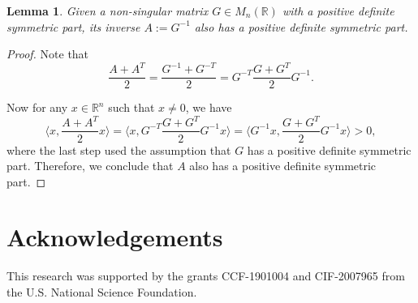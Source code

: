 \documentclass[a4paper, 11pt]{article}
\newtheorem{lem}[thm]{Lemma}
\begin{document}
\vspace{.3em} \begin{lem}
\label{lem:inv_psd}
Given a non-singular matrix $G\in M_n(\mathbb{R})$ with a positive definite symmetric part, its inverse $A:=G^{-1}$ also has a positive definite symmetric part.
\end{lem}
\begin{proof}
Note that
\[\frac{ A + A^T}{2}= \frac{G^{-1} + G^{-T}}{2} = G^{-T} \frac{G + G^T}{2} G^{-1}.\]

Now for any $x\in\mathbb{R}^n$ such that $x\neq 0$, we have
\[\bigg\langle x, \frac{ A + A^T}{2}x\bigg\rangle
=\bigg\langle x, G^{-T} \frac{G + G^T}{2} G^{-1}x\bigg\rangle =\bigg\langle G^{-1}x, \frac{G + G^T}{2}G^{-1}x\bigg\rangle> 0,\] where the last step used the assumption that $G$ has a positive definite symmetric part. Therefore, we conclude that $A$ also has a positive definite symmetric part.
\end{proof}

\section*{Acknowledgements}

This research was supported by the grants CCF-1901004 and CIF-2007965 from the U.S. National Science Foundation.
\end{document}
